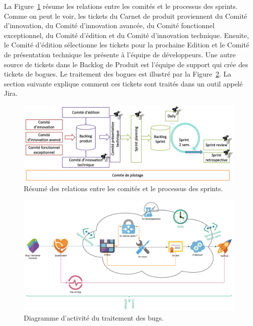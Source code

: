 La Figure~\ref{fig:committees-and-scrum} résume les relations entre les comités et le processus des sprints. Comme on peut le voir, les tickets du Carnet de produit proviennent du Comité d'innovation, du Comité d'innovation avancée, du Comité fonctionnel exceptionnel, du Comité d'édition et du Comité d'innovation technique. Ensuite, le Comité d'édition sélectionne les tickets pour la prochaine Edition et le Comité de présentation technique les présente à l'équipe de développeurs. Une autre source de tickets dans le Backlog de Produit est l'équipe de support qui crée des tickets de bogues. Le traitement des bogues est illustré par la Figure~\ref{fig:treatment-of-bugs}. La section suivante explique comment ces tickets sont traités dans un outil appelé Jira.

\begin{figure}[ht]
    \centering
    \includegraphics[width=\textwidth]{img/committees-and-scrum}
    \caption{Résumé des relations entre les comités et le processus des sprints.}
    \label{fig:committees-and-scrum}
\end{figure}

\begin{figure}[ht]
    \centering
    \includegraphics[width=\textwidth]{img/treatment-of-bugs}
    \caption{Diagramme d'activité du traitement des bugs.}
    \label{fig:treatment-of-bugs}
\end{figure}